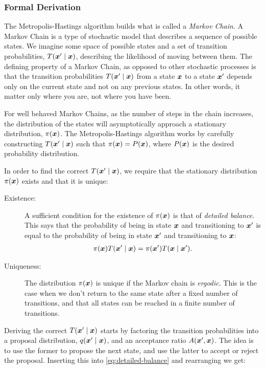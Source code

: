 \documentclass[Thesis.tex]{subfiles}
\begin{document}
\subsubsection{Formal Derivation}

The Metropolis-Hastings algorithm builds what is called a \emph{Markov Chain}. A
Markov Chain is a type of stochastic model that describes a sequence of possible
states. We imagine some space of possible states and a set of transition
probabilities, $T\qty(\bm{x}'\;\middle|\;\bm{x})$, describing the likelihood of moving between them.
The defining property of a Markov Chain, as opposed to other stochastic
processes is that the transition probabilities $T\qty(\bm{x}'\;\middle|\;\bm{x})$ from a state $\bm{x}$
to a state $\bm{x}'$ depends only on the current state and not on any previous
states. In other words, it matter only where you are, not where you have been.

For well behaved Markov Chains, as the number of steps in the chain increases,
the distribution of the states will asymptotically approach a stationary
distribution, $\pi(\bm{x})$. The Metropolis-Hastings algorithm works by carefully
constructing $T\qty(\bm{x}'\;\middle|\;\bm{x})$ such that $\pi(\bm{x})=P(\bm{x})$, where $P(\bm{x})$ is the
desired probability distribution. 

In order to find the correct $T\qty(\bm{x}'\;\middle|\;\bm{x})$, we require that the stationary
distribution $\pi(\bm{x})$ exists and that it is unique:

\begin{description}
\item[Existence:] A sufficient condition for the existence of $\pi(\bm{x})$ is that
  of \emph{detailed balance}. This says that the probability of being in state
  $\bm{x}$ and transitioning to $\bm{x}'$ is equal to the probability of being in state
  $\bm{x}'$ and transitioning to $\bm{x}$:
  \begin{align}
    \label{eq:detailed-balance}
    \pi\qty(\bm{x})T\qty(\bm{x}'\;\middle|\;\bm{x}) = \pi\qty(\bm{x}')T\qty(\bm{x}\;\middle|\;\bm{x}').
  \end{align}
\item[Uniqueness:] The distribution $\pi(\bm{x})$ is unique if the Markov chain is
  \emph{ergodic}. This is the case when we don't return to the same state after
  a fixed number of transitions, and that all states can be reached in a finite
  number of transitions.
\end{description}
Deriving the correct $T\qty(\bm{x}'\;\middle|\;\bm{x})$ starts by factoring the transition
probabilities into a proposal distribution, $q\qty(\bm{x}'\;\middle|\;\bm{x})$, and an
acceptance ratio $A\qty(\bm{x}',\bm{x})$. The idea is to use the former to propose the
next state, and use the latter to accept or reject the proposal. Inserting this
into \cref{eq:detailed-balance} and rearranging we get:
\end{document}
